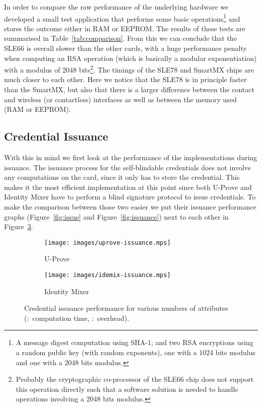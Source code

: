 In order to compare the raw performance of the underlying hardware we developed
a small test application that performs some basic operations\footnote{A message
digest computation using SHA-1; and two RSA encryptions 
using a random public key (with random exponents), one with a 1024 bits modulus
and one with a 2048 bits modulus.} and stores the outcome either in 
RAM or EEPROM. The results of these tests are 
summarised in Table~\ref{tab:comparison}. From this we can conclude that the 
SLE66 is overall slower than the other cards, with a huge performance penalty 
when computing an RSA operation (which is basically a modular exponentiation)
with a modulus of 2048 bits\footnote{Probably the cryptographic co-processor of
the SLE66 chip does not support this operation directly such that a software
solution is needed to handle operations involving a 2048 bits modulus.}. The
timings of the SLE78 and SmartMX chips are much closer to each other. Here we
notice that the SLE78 is in principle faster than the SmartMX, but also that
there is a larger difference between the contact and wireless (or contactless)
interfaces as well as between the memory used (RAM or EEPROM).

\subsection{Credential Issuance}

With this in mind we first look at the performance of the implementations during
issuance. The issuance process for the self-blindable credentials does not
involve any computations on the card, since it only has to store the credential.
This makes it the most efficient implementation at this point since both U-Prove
and Identity Mixer have to perform a blind signature protocol to issue
credentials. To make the comparison between those two easier we put their
issuance performance graphs (Figure~\ref{fig:issue} and Figure~\ref{fig:issuance})
next to each other in Figure~\ref{fig:comparison-issuance}.

\begin{figure}[ht]
  \centering
  \begin{subfigure}[b]{0.45\textwidth}
  \texttt{[image: images/uprove-issuance.mps]}
    \caption{U-Prove}
    \label{fig:uprove-issuance}
  \end{subfigure}
  \begin{subfigure}[b]{0.45\textwidth}
  \texttt{[image: images/idemix-issuance.mps]}
    \caption{Identity Mixer}
    \label{fig:idemix-issuance}
  \end{subfigure}

  \caption[Credential issuance performance for various numbers of attributes.]{
    Credential issuance performance for various numbers of attributes
    (:~computation time,
      :~overhead).}
  \label{fig:comparison-issuance}
\end{figure}

